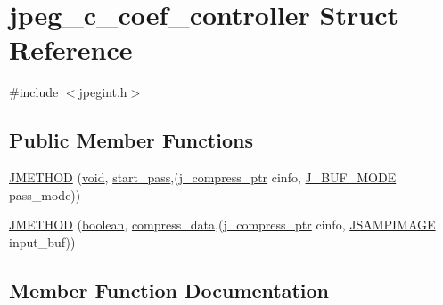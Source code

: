 \hypertarget{structjpeg__c__coef__controller}{}\section{jpeg\+\_\+c\+\_\+coef\+\_\+controller Struct Reference}
\label{structjpeg__c__coef__controller}


{\ttfamily \#include $<$jpegint.\+h$>$}

\subsection*{Public Member Functions}
\begin{DoxyCompactItemize}
\item 
\hyperlink{structjpeg__c__coef__controller_a975b8ac2bcd4ea8065eb676ea805d78e}{J\+M\+E\+T\+H\+O\+D} (\hyperlink{png_8h_aa8c59027f9ab2769342f248709d68d17}{void}, \hyperlink{jddctmgr_8c_a1964f006adb8fb80f57e455f6452aec1}{start\+\_\+pass},(\hyperlink{jpeglib_8h_add2a072c54e3a51550f4975f7ddb91e7}{j\+\_\+compress\+\_\+ptr} cinfo, \hyperlink{jpegint_8h_a1f0803342372ac62b6903c399399c874}{J\+\_\+\+B\+U\+F\+\_\+\+M\+O\+D\+E} pass\+\_\+mode))
\item 
\hyperlink{structjpeg__c__coef__controller_a1aaf8a93ba0bd239b36f4d48657c88ee}{J\+M\+E\+T\+H\+O\+D} (\hyperlink{jmorecfg_8h_a7c6368b321bd9acd0149b030bb8275ed}{boolean}, \hyperlink{jccoefct_8c_a1b0b1f4c0a7f4ce97c00607f23977d6c}{compress\+\_\+data},(\hyperlink{jpeglib_8h_add2a072c54e3a51550f4975f7ddb91e7}{j\+\_\+compress\+\_\+ptr} cinfo, \hyperlink{jpeglib_8h_a4bf858e4d42202287e786bdec2f3b62b}{J\+S\+A\+M\+P\+I\+M\+A\+G\+E} input\+\_\+buf))
\end{DoxyCompactItemize}


\subsection{Member Function Documentation}
\hypertarget{structjpeg__c__coef__controller_a975b8ac2bcd4ea8065eb676ea805d78e}{}
